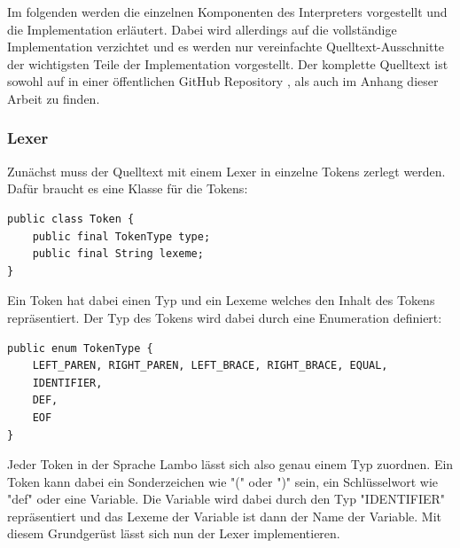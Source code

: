 \documentclass[ngerman]{article}
\begin{document}
Im folgenden werden die einzelnen Komponenten des Interpreters vorgestellt und die Implementation erläutert. Dabei wird allerdings auf die vollständige Implementation verzichtet und es werden nur vereinfachte Quelltext-Ausschnitte der wichtigsten Teile der Implementation vorgestellt. Der komplette Quelltext ist sowohl auf in einer öffentlichen GitHub Repository \cite{logithub}, als auch im Anhang dieser Arbeit zu finden.

\subsubsection{Lexer}

Zunächst muss der Quelltext mit einem Lexer in einzelne Tokens zerlegt werden. Dafür braucht es eine Klasse für die Tokens:
\begin{lstlisting}
public class Token {
    public final TokenType type;
    public final String lexeme;
}
\end{lstlisting}
Ein Token hat dabei einen Typ und ein Lexeme welches den Inhalt des Tokens repräsentiert. Der Typ des Tokens wird dabei durch eine Enumeration definiert:
\begin{lstlisting}[caption={TODO: Referenz zu Anhang}, captionpos=b]
public enum TokenType {
    LEFT_PAREN, RIGHT_PAREN, LEFT_BRACE, RIGHT_BRACE, EQUAL,
    IDENTIFIER,
    DEF,
    EOF
}
\end{lstlisting}
Jeder Token in der Sprache Lambo lässt sich also genau einem Typ zuordnen. Ein Token kann dabei ein Sonderzeichen wie "(" oder ")" sein, ein Schlüsselwort wie "def" oder eine Variable. Die Variable wird dabei durch den Typ "IDENTIFIER" repräsentiert und das Lexeme der Variable ist dann der Name der Variable.
Mit diesem Grundgerüst lässt sich nun der Lexer implementieren.
\end{document}
